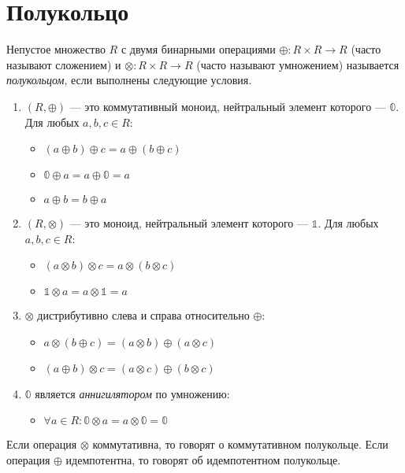 \section{Полукольцо}

\begin{definition}

Непустое множество $R$ с двумя бинарными операциями $\oplus\colon R \times R \to R$ (часто называют сложением) и $\otimes \colon R \times R \to R$ (часто называют умножением) называется \emph{полукольцом}, если выполнены следующие условия.
\begin{enumerate}

\item $(R, \oplus)$ --- это коммутативный моноид, нейтральный элемент которого --- $\mathbb{0}$. Для любых $a,b,c \in R$:
\begin{itemize}
	\item $(a \oplus b) \oplus c = a \oplus (b \oplus c)$
	\item $\mathbb{0} \oplus a = a \oplus \mathbb{0} = a$
	\item $a \oplus b = b \oplus a$
\end{itemize}

\item $(R, \otimes)$ --- это моноид, нейтральный элемент которого --- $\mathbb{1}$. Для любых $a,b,c \in R$:
\begin{itemize}
	\item $(a \otimes b) \otimes c = a \otimes (b \otimes c)$
    \item $\mathbb{1} \otimes a = a \otimes \mathbb{1} = a$
\end{itemize}

\item $\otimes$ дистрибутивно слева и справа относительно $\oplus$:
\begin{itemize}
	\item $a \otimes (b \oplus c) = (a \otimes b) \oplus (a \otimes c)$
    \item $(a \oplus b) \otimes c = (a \otimes c) \oplus (b \otimes c)$
\end{itemize}


\item $\mathbb{0}$ является \textit{аннигилятором} по умножению:
\begin{itemize}
	\item $\forall a \in R: \mathbb{0} \otimes a = a \otimes \mathbb{0} = \mathbb{0}$
\end{itemize}

\end{enumerate}

Если операция $\otimes$ коммутативна, то говорят о коммутативном полукольце.
Если операция $\oplus$ идемпотентна, то говорят об идемпотентном полукольце.

\end{definition}

